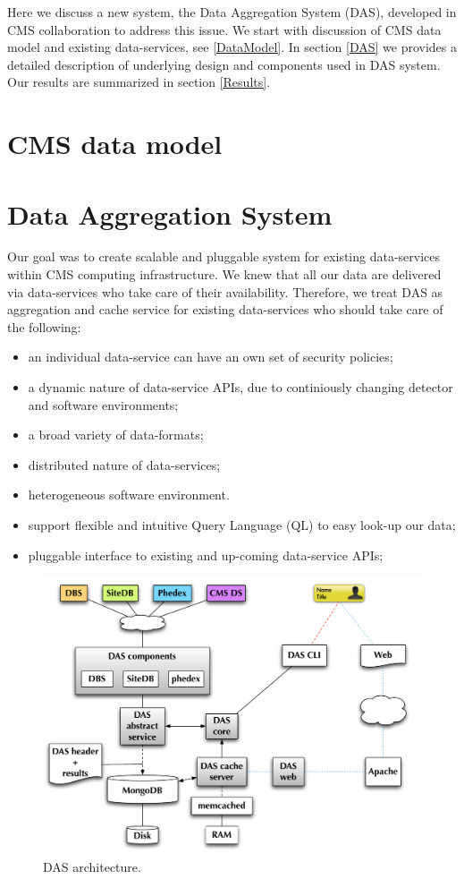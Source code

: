 \documentclass[a4paper]{jpconf}
\begin{document}
Here we discuss a new system, the Data Aggregation System (DAS),
developed in CMS collaboration to address this issue. We start with
discussion of CMS data model and existing data-services, see \ref{DataModel}. 
In section \ref{DAS}
we provides a detailed description of underlying design and components
used in DAS system. Our results are summarized in section \ref{Results}.

\section{CMS data model\label{DataModel}}

\section{Data Aggregation System\label{DAS}}
Our goal was to create scalable and pluggable system for existing data-services
within CMS computing infrastructure. We knew that all our data are delivered 
via data-services who take care of their availability. Therefore, we treat 
DAS as aggregation and cache service for existing data-services who should
take care of the following:
\begin{itemize}
\item an individual data-service can have an own set of security policies;
\item a dynamic nature of data-service APIs, due to continiously changing
detector and software environments;
\item a broad variety of data-formats;
\item distributed nature of data-services;
\item heterogeneous software environment.
\item support flexible and intuitive Query Language (QL) to easy look-up our
data;
\item pluggable interface to existing and up-coming data-service APIs;
\end{itemize}

\begin{figure}[htb]
\centering
\includegraphics[width=150mm]{DAS_architecture.pdf}
\caption{
DAS architecture.
}
\label{DAS_arch}
\end{figure}
\end{document}
